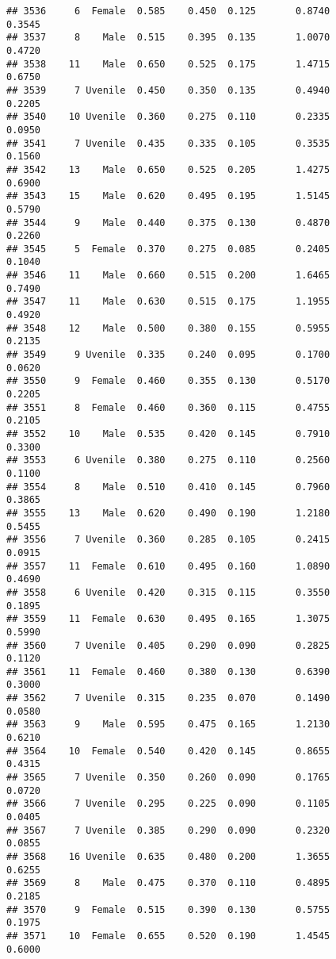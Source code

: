 \documentclass[
]{article}
\begin{document}
\begin{verbatim}
## 3536     6  Female  0.585    0.450  0.125       0.8740         0.3545
## 3537     8    Male  0.515    0.395  0.135       1.0070         0.4720
## 3538    11    Male  0.650    0.525  0.175       1.4715         0.6750
## 3539     7 Uvenile  0.450    0.350  0.135       0.4940         0.2205
## 3540    10 Uvenile  0.360    0.275  0.110       0.2335         0.0950
## 3541     7 Uvenile  0.435    0.335  0.105       0.3535         0.1560
## 3542    13    Male  0.650    0.525  0.205       1.4275         0.6900
## 3543    15    Male  0.620    0.495  0.195       1.5145         0.5790
## 3544     9    Male  0.440    0.375  0.130       0.4870         0.2260
## 3545     5  Female  0.370    0.275  0.085       0.2405         0.1040
## 3546    11    Male  0.660    0.515  0.200       1.6465         0.7490
## 3547    11    Male  0.630    0.515  0.175       1.1955         0.4920
## 3548    12    Male  0.500    0.380  0.155       0.5955         0.2135
## 3549     9 Uvenile  0.335    0.240  0.095       0.1700         0.0620
## 3550     9  Female  0.460    0.355  0.130       0.5170         0.2205
## 3551     8  Female  0.460    0.360  0.115       0.4755         0.2105
## 3552    10    Male  0.535    0.420  0.145       0.7910         0.3300
## 3553     6 Uvenile  0.380    0.275  0.110       0.2560         0.1100
## 3554     8    Male  0.510    0.410  0.145       0.7960         0.3865
## 3555    13    Male  0.620    0.490  0.190       1.2180         0.5455
## 3556     7 Uvenile  0.360    0.285  0.105       0.2415         0.0915
## 3557    11  Female  0.610    0.495  0.160       1.0890         0.4690
## 3558     6 Uvenile  0.420    0.315  0.115       0.3550         0.1895
## 3559    11  Female  0.630    0.495  0.165       1.3075         0.5990
## 3560     7 Uvenile  0.405    0.290  0.090       0.2825         0.1120
## 3561    11  Female  0.460    0.380  0.130       0.6390         0.3000
## 3562     7 Uvenile  0.315    0.235  0.070       0.1490         0.0580
## 3563     9    Male  0.595    0.475  0.165       1.2130         0.6210
## 3564    10  Female  0.540    0.420  0.145       0.8655         0.4315
## 3565     7 Uvenile  0.350    0.260  0.090       0.1765         0.0720
## 3566     7 Uvenile  0.295    0.225  0.090       0.1105         0.0405
## 3567     7 Uvenile  0.385    0.290  0.090       0.2320         0.0855
## 3568    16 Uvenile  0.635    0.480  0.200       1.3655         0.6255
## 3569     8    Male  0.475    0.370  0.110       0.4895         0.2185
## 3570     9  Female  0.515    0.390  0.130       0.5755         0.1975
## 3571    10  Female  0.655    0.520  0.190       1.4545         0.6000

\end{verbatim}
\end{document}

